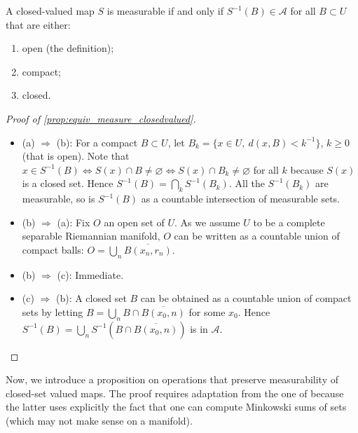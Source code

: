     \begin{proposition}\label{prop:equiv_measure_closedvalued}
        A closed-valued map $S$ is measurable if and only if $S^{-1}(B) \in \mathcal{A}$ for all $B \subset U$ that are either:
        \begin{enumerate}[label=(\alph*),nolistsep]
        \item open (the definition);
        \item compact;
        \item closed.
        \end{enumerate}
    \end{proposition}

    \begin{proof}[Proof of \cref{prop:equiv_measure_closedvalued}]\
    \begin{itemize}[nolistsep]
    \item(a) $\Rightarrow$ (b): For a compact $B \subset U$, let $B_k = \{ x \in U,\ d(x,B) < k^{-1} \}$, $k \geq 0$ (that is open). Note that $x \in S^{-1}(B) \Leftrightarrow S(x) \cap B \neq \varnothing \Leftrightarrow S(x) \cap B_k \neq \varnothing$ for all $k$ because $S(x)$ is a closed set. Hence $S^{-1}(B) = \bigcap_k S^{-1}(B_k)$. All the $S^{-1}(B_k)$ are measurable, so is $S^{-1}(B)$ as a countable intersection of measurable sets.

    \item (b) $\Rightarrow$ (a): Fix $O$ an open set of $U$. As we assume $U$ to be a complete separable Riemannian manifold, $O$ can be written as a countable union of compact balls: $O = \bigcup_n \overline{B(x_n, r_n)}$.

    \item (b) $\Rightarrow$ (c): Immediate.

    \item (c) $\Rightarrow$ (b): A closed set $B$ can be obtained as a countable union of compact sets by letting $B = \bigcup_n B \cap \overline{B(x_0, n)}$ for some $x_0$.
    Hence $S^{-1}(B) = \bigcup_n S^{-1}(B \cap \overline{B(x_0,n)})$ is in $\mathcal{A}$. \qedhere
    \end{itemize}
    \end{proof}

    Now, we introduce a proposition on operations that preserve measurability of closed-set valued maps. The proof requires adaptation from the one of \cite{rockafellar2009variational} because the latter uses explicitly the fact that one can compute Minkowski sums of sets (which may not make sense on a manifold).

